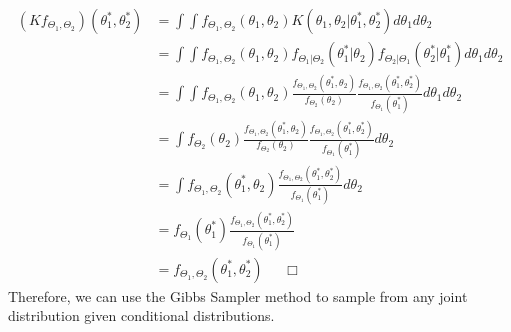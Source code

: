 \documentclass[10pt]{article}
\begin{document}
\begin{align*}
    \left( Kf_{\Theta_{1}, \Theta_{2}} \right) \left( \theta_{1}^{*}, \theta_{2}^{*} \right) &= \int \int f_{\Theta_{1}, \Theta_{2}} \left( \theta_{1}, \theta_{2} \right) K \left( \theta_{1}, \theta_{2} | \theta_{1}^{*}, \theta_{2}^{*}  \right) d \theta_{1} d \theta_{2} \\[1em]
    &= \int \int f_{\Theta_{1}, \Theta_{2}} \left( \theta_{1}, \theta_{2} \right) f_{\Theta_{1} | \Theta_{2}} \left( \theta_{1}^{*} | \theta_{2}\right) f_{\Theta_{2} | \Theta_{1}} \left( \theta_{2}^{*} | \theta_{1}^{*} \right) d \theta_{1} d \theta_{2} \\[1em]
    &= \int \int f_{\Theta_{1}, \Theta_{2}} \left( \theta_{1}, \theta_{2} \right) \frac{f_{\Theta_{1}, \Theta_{2}} \left( \theta_{1}^{*} , \theta_{2}\right)}{f_{\Theta_{2}} \left( \theta_{2} \right)} \frac{f_{\Theta_{1}, \Theta_{2}} \left( \theta_{1}^{*} , \theta_{2}^{*} \right)}{f_{\Theta_{1}} \left( \theta_{1}^{*} \right)} d \theta_{1} d \theta_{2} \\[1em]
    &= \int f_{\Theta_{2}} \left(\theta_{2} \right) \frac{f_{\Theta_{1}, \Theta_{2}} \left( \theta_{1}^{*} , \theta_{2}\right)}{f_{\Theta_{2}} \left( \theta_{2} \right)} \frac{f_{\Theta_{1}, \Theta_{2}} \left( \theta_{1}^{*} , \theta_{2}^{*} \right)}{f_{\Theta_{1}} \left( \theta_{1}^{*} \right)} d \theta_{2} \\[1em]
    &= \int f_{\Theta_{1}, \Theta_{2}} \left( \theta_{1}^{*} , \theta_{2}\right) \frac{f_{\Theta_{1}, \Theta_{2}} \left( \theta_{1}^{*} , \theta_{2}^{*} \right)}{f_{\Theta_{1}} \left( \theta_{1}^{*} \right)} d \theta_{2} \\[1em]
    &= f_{\Theta_{1}} \left( \theta_{1}^{*} \right) \frac{f_{\Theta_{1}, \Theta_{2}} \left( \theta_{1}^{*} , \theta_{2}^{*} \right)}{f_{\Theta_{1}} \left( \theta_{1}^{*} \right)} \\[1em]
    &= f_{\Theta_{1}, \Theta_{2}} \left( \theta_{1}^{*} , \theta_{2}^{*} \right) \; \; \; \; \; \Box
\end{align*} 
Therefore, we can use the Gibbs Sampler method to sample from any joint distribution given conditional distributions.
\\[1\baselineskip]
\end{document}
